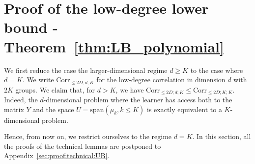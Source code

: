 \documentclass{article}
\begin{document}
%




\section{Proof of the low-degree  lower bound - Theorem~\ref{thm:LB_polynomial}}\label{sec:proof_LB}

We first reduce the case the larger-dimensional regime $d\geq K$ to the case where $d=K$. We write $\mathrm{Corr}_{\leq 2D;d;K}$ for the low-degree correlation in dimension $d$ with $2K$ groups. We claim that, for $d> K$, we have  $\mathrm{Corr}_{\leq 2D;d;K}\leq \mathrm{Corr}_{\leq 2D;K;K}$. Indeed, the $d$-dimensional problem where the learner has access both to the matrix $Y$ and the space $U= \mathrm{span}(\mu_k, k \leq K)$ is exactly equivalent to a $K$-dimensional problem. 



\medskip 

Hence, from now on, we restrict ourselves to the regime $d=K$. In this section, all the proofs of the technical lemmas are postponed to Appendix~\ref{sec:proof:technical:UB}. 
\end{document}
